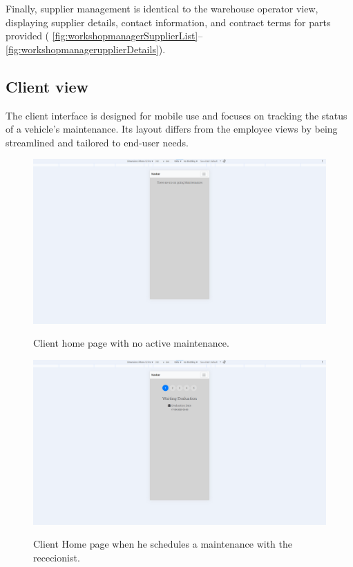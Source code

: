 Finally, supplier management is identical to the warehouse operator view, displaying supplier details, contact information, and contract terms for parts provided ( \ref{fig:workshopmanagerSupplierList}–\ref{fig:workshopmanagerupplierDetails}).



\subsection{Client view}



The client interface is designed for mobile use and focuses on tracking the status of a vehicle's maintenance. Its layout differs from the employee views by being streamlined and tailored to end-user needs.

\begin{figure}[h]
  \caption{Client home page with no active maintenance.}
  \centering
  \includegraphics[width=\textwidth]{figs/Implementation/client/MaintenanceNoState}
  \label{fig:MaintenanceNoState}
\end{figure}



\begin{figure}[h]
  \caption{Client Home page when he schedules a maintenance with the rececionist.}
  \centering
  \includegraphics[width=\textwidth]{figs/Implementation/client/MaintenanceState1}
  \label{fig:MaintenanceState1}
\end{figure}

